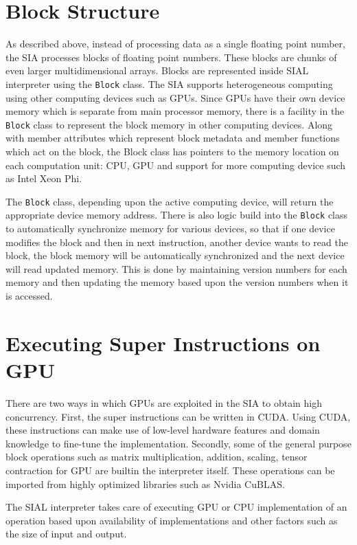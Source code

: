 \section{Block Structure}
As described above, instead of processing data as a single floating point
number, the SIA processes blocks of floating point numbers. These blocks are chunks
of even larger multidimensional arrays. Blocks are represented inside SIAL
interpreter using the \texttt{Block} class. The SIA supports heterogeneous computing
using other computing devices such as GPUs. Since GPUs have their own device memory
which is separate from main processor memory, there is a facility in the
\texttt{Block} class to represent the block memory in other
computing devices. Along with member attributes which represent block metadata
and member functions which act on the block, the Block class has pointers to
the memory location on each computation unit: CPU, GPU and support for more
computing device such as Intel Xeon Phi.

The \texttt{Block} class, depending upon the active computing device, will return the
appropriate device memory address. There is also logic build into the \texttt{Block}
class to automatically synchronize memory for various devices, so that if one
device modifies the block and then in next instruction, another device wants
to read the block, the block memory will be automatically synchronized and the
next device will read updated memory. This is done by maintaining version numbers
for each memory and then updating the memory based upon the version numbers when
it is accessed.

\section{Executing Super Instructions on GPU}
There are two ways in which GPUs are exploited in the SIA to obtain high concurrency.
First, the super instructions can be written in CUDA.
Using CUDA, these instructions can make use of low-level hardware
features and domain knowledge to fine-tune the implementation. Secondly, some of
the general purpose block operations such as matrix multiplication, addition,
scaling, tensor contraction for GPU are builtin the interpreter
itself. These operations can be imported from highly optimized libraries such as
Nvidia CuBLAS.

The SIAL interpreter takes care of executing GPU or CPU implementation of an
operation based upon availability of implementations and other factors such as
the size of input and output.
